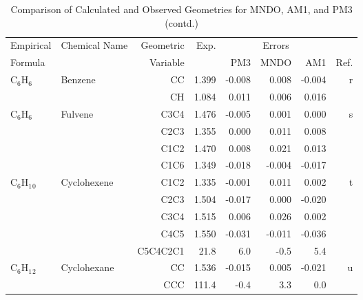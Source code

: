 \begin{table}
\caption{\label{geotabc}Comparison of Calculated and Observed Geometries for 
MNDO, AM1, and PM3 (contd.)}
\begin{center}
\compresstable
\begin{tabular}{llrrrrrr}
 Empirical  & Chemical Name &  Geometric &  Exp. & \multicolumn{3}{c}{Errors} & \\
  Formula   &               &  Variable &        & PM3  & MNDO  &  AM1 & Ref.\\
\hline
 C$_6$H$_6$        & Benzene                            &CC            &     1.399   &    -0.008 &     0.008 &    -0.004 &     r \\
             &                                    &CH            &     1.084   &     0.011 &     0.006 &     0.016 &       \\
 C$_6$H$_6$        & Fulvene                            &C3C4          &     1.476   &    -0.005 &     0.001 &     0.000 &     s \\
             &                                    &C2C3          &     1.355   &     0.000 &     0.011 &     0.008 &       \\
             &                                    &C1C2          &     1.470   &     0.008 &     0.021 &     0.013 &       \\
             &                                    &C1C6          &     1.349   &    -0.018 &    -0.004 &    -0.017 &       \\
 C$_6$H$_1$$_0$       & Cyclohexene                        &C1C2          &     1.335   &    -0.001 &     0.011 &     0.002 &     t \\
             &                                    &C2C3          &     1.504   &    -0.017 &     0.000 &    -0.020 &       \\
             &                                    &C3C4          &     1.515   &     0.006 &     0.026 &     0.002 &       \\
             &                                    &C4C5          &     1.550   &    -0.031 &    -0.011 &    -0.036 &       \\
             &                                    &C5C4C2C1    &      21.8   &       6.0 &      -0.5 &       5.4   &       \\
 C$_6$H$_1$$_2$       & Cyclohexane                        &CC            &     1.536   &    -0.015 &     0.005 &    -0.021 &     u \\
             &                                    &CCC         &     111.4   &      -0.4 &       3.3 &       0.0   &       \\

\end{tabular}
\end{center}
\end{table}

